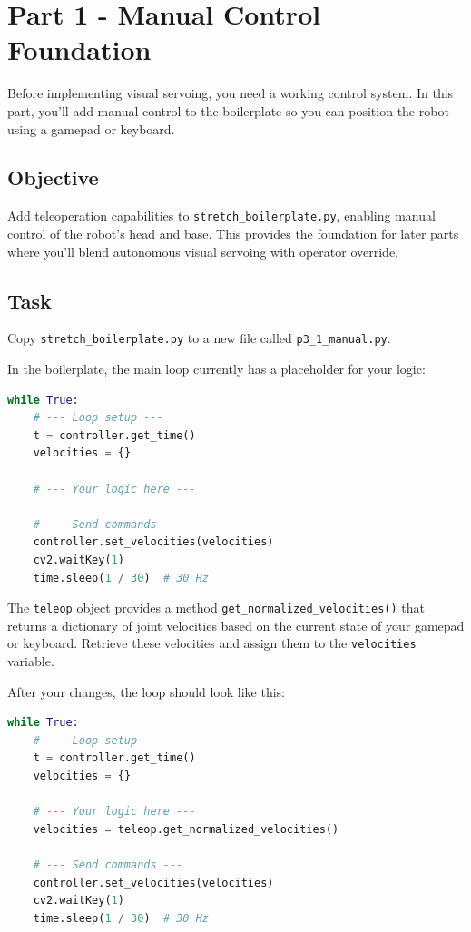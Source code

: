 \documentclass[11pt,a4paper]{article}
\begin{document}
\newpage

\section*{Part 1 - Manual Control Foundation}

Before implementing visual servoing, you need a working control system. In this part, you'll add manual control to the boilerplate so you can position the robot using a gamepad or keyboard.

\subsection*{Objective}

Add teleoperation capabilities to \texttt{stretch\_boilerplate.py}, enabling manual control of the robot's head and base. This provides the foundation for later parts where you'll blend autonomous visual servoing with operator override.

\subsection*{Task}

Copy \texttt{stretch\_boilerplate.py} to a new file called \texttt{p3\_1\_manual.py}. 

In the boilerplate, the main loop currently has a placeholder for your logic:

\begin{lstlisting}[language=Python]
while True:
    # --- Loop setup ---
    t = controller.get_time()
    velocities = {}

    # --- Your logic here ---

    # --- Send commands ---
    controller.set_velocities(velocities)
    cv2.waitKey(1)
    time.sleep(1 / 30)  # 30 Hz
\end{lstlisting}

The \texttt{teleop} object provides a method \texttt{get\_normalized\_velocities()} that returns a dictionary of joint velocities based on the current state of your gamepad or keyboard. Retrieve these velocities and assign them to the \texttt{velocities} variable.

After your changes, the loop should look like this:

\begin{lstlisting}[language=Python]
while True:
    # --- Loop setup ---
    t = controller.get_time()
    velocities = {}

    # --- Your logic here ---
    velocities = teleop.get_normalized_velocities()

    # --- Send commands ---
    controller.set_velocities(velocities)
    cv2.waitKey(1)
    time.sleep(1 / 30)  # 30 Hz
\end{lstlisting}
\end{document}
